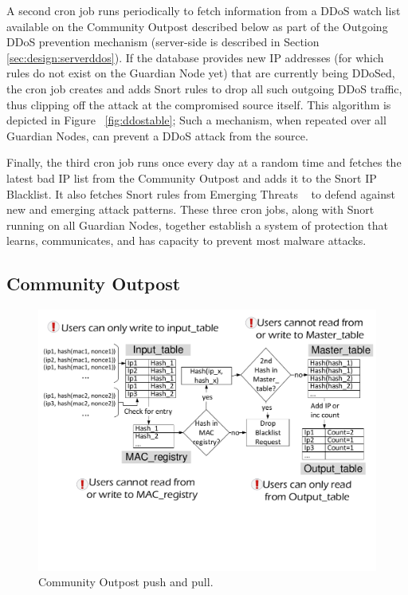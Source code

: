 A second cron job runs periodically to fetch information from a DDoS watch list available on the Community Outpost described below as part of the Outgoing DDoS prevention mechanism (server-side is described in Section \ref{sec:design:serverddos}). If the database provides new IP addresses (for which rules do not exist on the Guardian Node yet) that are currently being DDoSed, the cron job creates and adds Snort rules to drop all such outgoing DDoS traffic, thus clipping off the attack at the compromised source itself. 
This algorithm is depicted in Figure ~\ref{fig:ddostable}; Such a mechanism, when repeated over all Guardian Nodes, can prevent a DDoS attack from the source.

Finally, the third cron job runs once every day at a random time and fetches the latest bad IP list from the Community Outpost and adds it to the Snort IP Blacklist. It also fetches Snort rules from Emerging Threats ~\cite{emerging} to defend against new and emerging attack patterns. These three cron jobs, along with Snort running on all Guardian Nodes, together establish a system of protection that learns, communicates, and has capacity to prevent most malware attacks.

\subsection{Community Outpost}
\label{sec:design:server}

\begin{figure}
    \centering
    \includegraphics[width=0.95\linewidth]{figs/blacklistserver.pdf}
    \caption{Community Outpost push and pull.}
    \label{fig:blacklistserver}
\end{figure}

